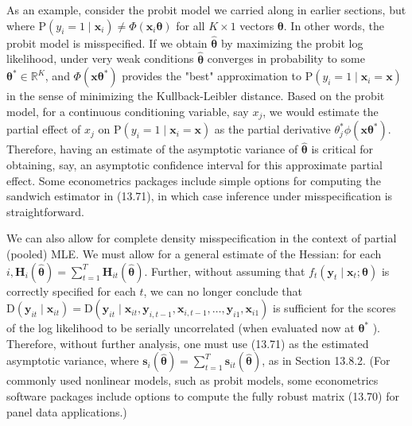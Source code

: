 \documentclass[10pt]{article}
\begin{document}
As an example, consider the probit model we carried along in earlier sections, but where $\mathrm{P}\left(y_{i}=1 \mid \mathbf{x}_{i}\right) \neq \Phi\left(\mathbf{x}_{i} \boldsymbol{\theta}\right)$ for all $K \times 1$ vectors $\boldsymbol{\theta}$. In other words, the probit model is misspecified. If we obtain $\hat{\boldsymbol{\theta}}$ by maximizing the probit log likelihood, under very weak conditions $\hat{\boldsymbol{\theta}}$ converges in probability to some $\boldsymbol{\theta}^{*} \in \mathbb{R}^{K}$, and $\Phi\left(\mathbf{x} \boldsymbol{\theta}^{*}\right)$ provides the "best" approximation to $\mathrm{P}\left(y_{i}=1 \mid \mathbf{x}_{i}=\mathbf{x}\right)$ in the sense of minimizing the Kullback-Leibler distance. Based on the probit model, for a continuous conditioning variable, say $x_{j}$, we would estimate the partial effect of $x_{j}$ on $\mathrm{P}\left(y_{i}=1 \mid \mathbf{x}_{i}=\mathbf{x}\right)$ as the partial derivative $\theta_{j}^{*} \phi\left(\mathbf{x} \boldsymbol{\theta}^{*}\right)$. Therefore, having an estimate of the asymptotic variance of $\hat{\boldsymbol{\theta}}$ is critical for obtaining, say, an asymptotic confidence interval for this approximate partial effect. Some econometrics packages include simple options for computing the sandwich estimator in (13.71), in which case inference under misspecification is straightforward.

We can also allow for complete density misspecification in the context of partial (pooled) MLE. We must allow for a general estimate of the Hessian: for each $i, \mathbf{H}_{i}(\hat{\boldsymbol{\theta}})=\sum_{t=1}^{T} \mathbf{H}_{i t}(\hat{\boldsymbol{\theta}})$. Further, without assuming that $f_{t}\left(\mathbf{y}_{t} \mid \mathbf{x}_{t} ; \boldsymbol{\theta}\right)$ is correctly specified for each $t$, we can no longer conclude that $\mathrm{D}\left(\mathbf{y}_{i t} \mid \mathbf{x}_{i t}\right)= \mathrm{D}\left(\mathbf{y}_{i t} \mid \mathbf{x}_{i t}, \mathbf{y}_{i, t-1}, \mathbf{x}_{i, t-1}, \ldots, \mathbf{y}_{i 1}, \mathbf{x}_{i 1}\right)$ is sufficient for the scores of the log likelihood to be serially uncorrelated (when evaluated now at $\boldsymbol{\theta}^{*}$ ). Therefore, without further analysis, one must use (13.71) as the estimated asymptotic variance, where $\mathbf{s}_{i}(\hat{\boldsymbol{\theta}})= \sum_{t=1}^{T} \mathbf{s}_{i t}(\hat{\boldsymbol{\theta}})$, as in Section 13.8.2. (For commonly used nonlinear models, such as probit models, some econometrics software packages include options to compute the fully robust matrix (13.70) for panel data applications.)
\end{document}
